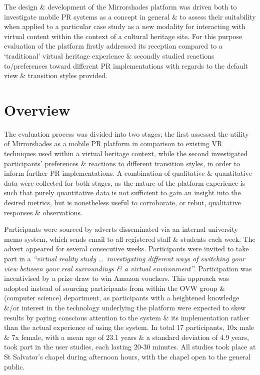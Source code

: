 The design \& development of the Mirrorshades platform was driven both to investigate mobile PR systems as a concept in general \& to assess their suitability when applied to a particular case study as a new modality for interacting with virtual content within the context of a cultural heritage site. For this purpose evaluation of the platform firstly addressed its reception compared to a `traditional' virtual heritage experience \& secondly studied reactions to/preferences toward different PR implementations with regards to the default view \& transition styles provided.




\section{Overview}

The evaluation process was divided into two stages; the first assessed the utility of Mirrorshades as a mobile PR platform in comparison to existing VR techniques used within a virtual heritage context, while the second investigated participants' preferences \& reactions to different transition styles, in order to inform further PR implementations. A combination of qualitative \& quantitative data were collected for both stages, as the nature of the platform experience is such that purely quantitative data is not sufficient to gain an insight into the desired metrics, but is nonetheless useful to corroborate, or rebut, qualitative responses \& observations.

Participants were sourced by adverts disseminated via an internal university memo system, which sends email to all registered staff \& students each week. The advert appeared for several consecutive weeks. Participants were invited to take part in a \textit{``virtual reality study \ldots\ investigating different ways of switching your view between your real surroundings \& a virtual environment''}. Participation was incentivised by a prize draw to win Amazon vouchers. This approach was adopted instead of sourcing participants from within the OVW group \& (computer science) department, as participants with a heightened knowledge \&/or interest in the technology underlying the platform were expected to skew results by paying conscious attention to the system \& its implementation rather than the actual experience of using the system. In total 17 participants, 10x male \& 7x female, with a mean age of 23.1 years \& a standard deviation of 4.9 years, took part in the user studies, each lasting 20-30 minutes. All studies took place at St Salvator's chapel during afternoon hours, with the chapel open to the general public.

